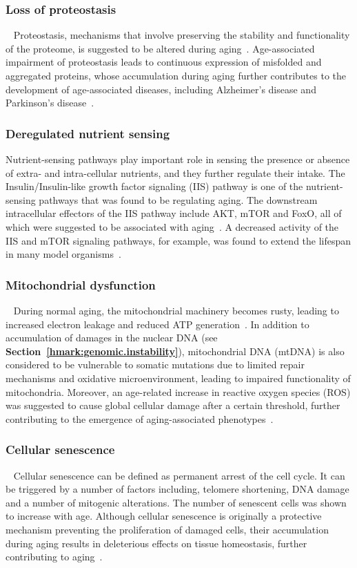 \subsubsection{Loss of proteostasis}~\label{hmark:proteosis}
Proteostasis, mechanisms that involve preserving the stability and functionality of the proteome, is suggested to be altered during aging~\autocite{Koga2011}. 
Age-associated impairment of proteostasis leads to continuous expression of misfolded and aggregated proteins, 
whose accumulation during aging further contributes to the development of age-associated diseases, including Alzheimer's disease and Parkinson's disease~\autocite{Powers2009}.

\subsubsection{Deregulated nutrient sensing}
Nutrient-sensing pathways play important role in sensing the presence or absence of extra- and intra-cellular nutrients, and they further regulate their intake.
The Insulin/Insulin-like growth factor signaling (IIS) pathway is one of the nutrient-sensing pathways that was found to be regulating aging.
The downstream intracellular effectors of the IIS pathway include AKT, mTOR and FoxO, all of which were suggested to be associated with aging~\autocite{Fontana2010, Barzilai2012, Kenyon2010}.
A decreased activity of the IIS and mTOR signaling pathways, for example, was found to extend the lifespan in many model organisms~\autocite{Fontana2010}. 

\subsubsection{Mitochondrial dysfunction}~\label{hmark:mt.dysfunction}
During normal aging, the mitochondrial machinery becomes rusty, leading to increased electron leakage and reduced ATP generation~\autocite{Green2011}.
In addition to accumulation of damages in the nuclear DNA (see \textbf{Section~\ref{hmark:genomic.instability}}), 
mitochondrial DNA (mtDNA) is also considered to be vulnerable to somatic mutations due to limited repair mechanisms and oxidative microenvironment,
leading to impaired functionality of mitochondria.
Moreover, an age-related increase in reactive oxygen species (ROS) was suggested to cause global cellular damage after a certain threshold, 
further contributing to the emergence of aging-associated phenotypes~\autocite{Hekimi2011}.

\subsubsection{Cellular senescence}~\label{hmark:cell.senes}
Cellular senescence can be defined as permanent arrest of the cell cycle.
It can be triggered by a number of factors including, telomere shortening, DNA damage and a number of mitogenic alterations.
The number of senescent cells was shown to increase with age.
Although cellular senescence is originally a protective mechanism preventing the proliferation of damaged cells,
their accumulation during aging results in deleterious effects on tissue homeostasis, further contributing to aging~\autocite{Lopez2013}.

